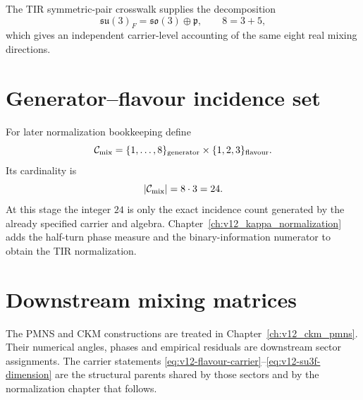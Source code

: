The TIR symmetric-pair crosswalk supplies the decomposition
\begin{equation}
\mathfrak{su}(3)_F
=\mathfrak{so}(3)\oplus\mathfrak p,
\qquad
8=3+5,
\label{eq:v12-su3-symmetric-pair}
\end{equation}
which gives an independent carrier-level accounting of the same eight real
mixing directions.

\section{Generator--flavour incidence set}
For later normalization bookkeeping define
\begin{equation}
\mathcal C_{\rm mix}
=\{1,\ldots,8\}_{\rm generator}
\times\{1,2,3\}_{\rm flavour}.
\label{eq:v12-mixing-incidence-set}
\end{equation}
Its cardinality is
\begin{equation}
|\mathcal C_{\rm mix}|
=8\cdot3
=24.
\label{eq:v12-mixing-incidence-cardinality}
\end{equation}
At this stage the integer $24$ is only the exact incidence count generated by
the already specified carrier and algebra.  Chapter~\ref{ch:v12_kappa_normalization}
adds the half-turn phase measure and the binary-information numerator to obtain
the TIR normalization.

\section{Downstream mixing matrices}
The PMNS and CKM constructions are treated in
Chapter~\ref{ch:v12_ckm_pmns}.  Their numerical angles, phases and empirical
residuals are downstream sector assignments.  The carrier statements
\eqref{eq:v12-flavour-carrier}--\eqref{eq:v12-su3f-dimension} are the structural
parents shared by those sectors and by the normalization chapter that follows.
